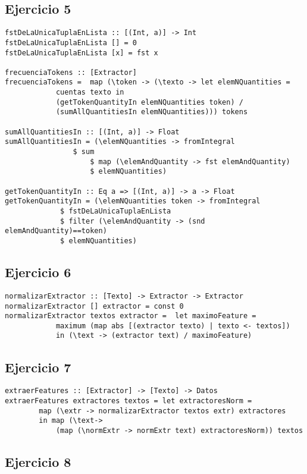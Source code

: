 \documentclass[spanish, 10pt,a4paper]{article}
\numberwithin{equation}{section} %
\begin{document}
\subsection{Ejercicio 5}

\begin{lstlisting}
fstDeLaUnicaTuplaEnLista :: [(Int, a)] -> Int
fstDeLaUnicaTuplaEnLista [] = 0
fstDeLaUnicaTuplaEnLista [x] = fst x 

frecuenciaTokens :: [Extractor]
frecuenciaTokens =  map (\token -> (\texto -> let elemNQuantities = 
			cuentas texto in 
			(getTokenQuantityIn elemNQuantities token) /
			(sumAllQuantitiesIn elemNQuantities))) tokens 

sumAllQuantitiesIn :: [(Int, a)] -> Float
sumAllQuantitiesIn = (\elemNQuantities -> fromIntegral 
				$ sum  
			    	$ map (\elemAndQuantity -> fst elemAndQuantity)
			    	$ elemNQuantities)

getTokenQuantityIn :: Eq a => [(Int, a)] -> a -> Float
getTokenQuantityIn = (\elemNQuantities token -> fromIntegral 
		     $ fstDeLaUnicaTuplaEnLista 
		     $ filter (\elemAndQuantity -> (snd elemAndQuantity)==token) 
		     $ elemNQuantities)
\end{lstlisting}


\subsection{Ejercicio 6}

\begin{lstlisting}
normalizarExtractor :: [Texto] -> Extractor -> Extractor
normalizarExtractor [] extractor = const 0
normalizarExtractor textos extractor =  let maximoFeature = 
			maximum (map abs [(extractor texto) | texto <- textos]) 
			in (\text -> (extractor text) / maximoFeature)
\end{lstlisting}


\subsection{Ejercicio 7}

\begin{lstlisting}
extraerFeatures :: [Extractor] -> [Texto] -> Datos 
extraerFeatures extractores textos = let extractoresNorm = 
		map (\extr -> normalizarExtractor textos extr) extractores 
		in map (\text-> 
		    (map (\normExtr -> normExtr text) extractoresNorm)) textos
\end{lstlisting}


\subsection{Ejercicio 8}
\end{document}
